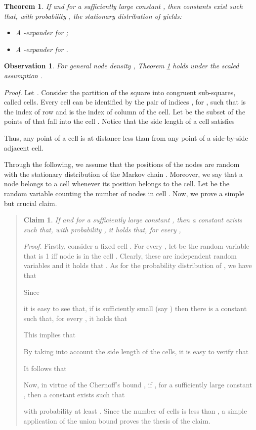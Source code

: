 \documentclass[10pt,a4paper]{article}
\newtheorem{theorem}[definition]{Theorem}
\newtheorem{obs}[definition]{Observation}
\newtheorem{claim}{Claim}
\newcommand{\proof}{\noindent\textit{Proof. }}
\newcommand{\qed}{\hspace{\stretch{1}}}
\begin{document}
\begin{theorem}\label{thm:geomexpan}
If   and   for a sufficiently large constant , then constants  exist such that, with probability , the stationary distribution of  yields:
\begin{itemize}
\item A -expander for ;
\item A -expander for .
\end{itemize}
\end{theorem}

\begin{obs}\label{obs::delta}
For general node density , Theorem \ref{thm:geomexpan} holds under the scaled assumption .
\end{obs}
\proof
Let . Consider the partition of the square  into  congruent sub-squares, called cells. Every cell can be identified by the pair of indices , for , such that  is the index of row and  is the index of column of the cell. Let  be the subset of the points of  that fall into the cell . Notice that the side length  of a cell satisfies

Thus, any point of a cell is at distance less than  from any point of a side-by-side adjacent cell.

\noindent Through the following, we assume that the positions of the nodes are random with the stationary distribution of the Markov chain . Moreover, we say that a node belongs to a cell whenever its position belongs to the cell. \noindent Let  be the random variable counting the number of nodes in cell . Now, we prove a simple but crucial claim.

\begin{quote}
\begin{claim}\label{claim:density}
If  and  for a sufficiently large constant , then a constant  exists such that, with probability , it holds that, for every ,

\end{claim}
\proof Firstly, consider a fixed cell . For every , let  be the 
random variable that is 1 iff node  is in the cell . Clearly, these are independent random
variables and it holds that . As for the probability distribution of
, we have that

Since

it is easy to see that, if  is sufficiently small (say ) then there is a constant  such that, for every , it holds that

This implies that

By taking into account the side length of the cells, it is easy to verify that 

It follows that

Now, in virtue of the Chernoff's bound \cite{ALICE}, if , for a sufficiently large
constant , then a constant  exists such that

with probability at least . Since the number of cells is less than , a simple
application of the union bound proves the thesis of the claim.
\qed
\end{quote}
\end{document}
